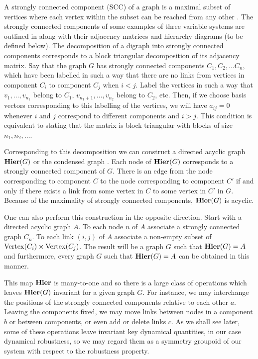 A strongly connected component (SCC) of a graph is a maximal subset of vertices where each vertex within the subset can be reached from any other \cite{Cormen2009}. The strongly connected components of some examples of three variable systems are outlined in  along with their adjacency matrices and hierarchy diagrams (to be defined below).
The decomposition of a digraph into strongly connected components corresponds to a block triangular decomposition of its adjacency matrix.  Say that the graph $G$ has strongly connected components $C_1, C_2, \ldots C_n$, which have been labelled in such a way that there are no links from vertices in component $C_i$ to component $C_j$ when $i < j$.  Label the vertices in such a way that $v_1, \ldots, v_{n_1}$ belong to $C_1$, $v_{n_1 + 1}, \ldots, v_{n_2}$ belong to $C_2$, etc.  Then, if we choose basis vectors corresponding to this labelling of the vertices, we will have $a_{ij} = 0$ whenever $i$ and $j$ correspond to different components and $i > j$.  This condition is equivalent to stating that the matrix is block triangular with blocks of size $n_1, n_2, \ldots$.

Corresponding to this decomposition we can construct a directed acyclic graph $\mathbf{Hier} (G)$ or the condensed graph \cite{Corominas-Murtra2013}.  Each node of $\mathbf{Hier} (G)$ corresponds to a strongly connected component of $G$. There is an edge from the node corresponding to component $C$ to the node corresponding to component $C'$ if and only if there exists a link from some vertex in $C$ to some vertex in $C'$ in $G$.  Because of the maximality of strongly connected components, $\mathbf{Hier} (G)$ is acyclic.

One can also perform this construction in the opposite direction.  Start with a directed acyclic graph $A$.  To each node $n$ of $A$ associate
a strongly connected graph $C_n$.  To each link $(i,j)$ of $A$ associate a non-empty subset of $\mathrm{Vertex}(C_i) \times \mathrm{Vertex}(C_j)$.  The result will be a graph $G$ such that $\mathbf{Hier}(G) = A$ and furthermore, every graph $G$ such that $\mathbf{Hier}(G) = A$ can be obtained in this manner.

This map $\mathbf{Hier}$ is many-to-one and so there is a large class of
operations which leaves $\mathbf{Hier}(G)$ invariant for a given graph $G$.
For instance, we may interchange the positions of the strongly
connected components relative to each other $a$.  Leaving the components fixed, we may move links between nodes in a component $b$ or between components, or even add or delete links $c$.  As we shall see later, some of these operations leave invariant key dynamical quantities, in our case dynamical robustness, so we may regard them as a symmetry groupoid of our system with respect to the robustness property.

